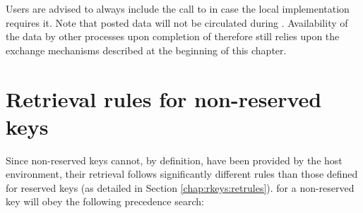 \adviceuserstart
Users are advised to always include the call to  in case the local implementation requires it. Note that posted data will not be circulated during . Availability of the data by other processes upon completion of  therefore still relies upon the exchange mechanisms described at the beginning of this chapter.
\adviceuserend


\section{Retrieval rules for non-reserved keys}
\label{chap:nrkeys:retrules}

Since non-reserved keys cannot, by definition, have been provided by the host
environment, their retrieval follows significantly different rules than those
defined for reserved keys (as detailed in Section \ref{chap:rkeys:retrules}).
 for a non-reserved key will obey the
following precedence search:

